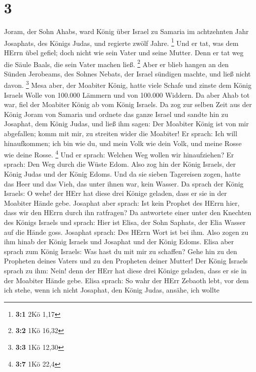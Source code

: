 \hypertarget{section-1}{%
\section{3}\label{section-1}}

 Joram, der Sohn Ahabs, ward König über Israel zu Samaria im
achtzehnten Jahr Josaphats, des Königs Judas, und regierte zwölf Jahre.
\footnote{\textbf{3:1} 2Kö 1,17}  Und er tat, was dem HErrn
übel gefiel; doch nicht wie sein Vater und seine Mutter. Denn er tat weg
die Säule Baals, die sein Vater machen ließ. \footnote{\textbf{3:2} 1Kö
  16,32}  Aber er blieb hangen an den Sünden Jerobeams, des
Sohnes Nebats, der Israel sündigen machte, und ließ nicht davon.
\footnote{\textbf{3:3} 1Kö 12,30}  Mesa aber, der Moabiter
König, hatte viele Schafe und zinste dem König Israels Wolle von 100.000
Lämmern und von 100.000 Widdern.  Da aber Ahab tot war, fiel
der Moabiter König ab vom König Israels.  Da zog zur selben
Zeit aus der König Joram von Samaria und ordnete das ganze Israel
 und sandte hin zu Josaphat, dem König Judas, und ließ ihm
sagen: Der Moabiter König ist von mir abgefallen; komm mit mir, zu
streiten wider die Moabiter! Er sprach: Ich will hinaufkommen; ich bin
wie du, und mein Volk wie dein Volk, und meine Rosse wie deine Rosse.
\footnote{\textbf{3:7} 1Kö 22,4}  Und er sprach: Welchen Weg
wollen wir hinaufziehen? Er sprach: Den Weg durch die Wüste Edom.
 Also zog hin der König Israels, der König Judas und der
König Edoms. Und da sie sieben Tagereisen zogen, hatte das Heer und das
Vieh, das unter ihnen war, kein Wasser.  Da sprach der
König Israels: O wehe! der HErr hat diese drei Könige geladen, dass er
sie in der Moabiter Hände gebe.  Josaphat aber sprach: Ist
kein Prophet des HErrn hier, dass wir den HErrn durch ihn ratfragen? Da
antwortete einer unter den Knechten des Königs Israels und sprach: Hier
ist Elisa, der Sohn Saphats, der Elia Wasser auf die Hände goss.
 Josaphat sprach: Des HErrn Wort ist bei ihm. Also zogen zu
ihm hinab der König Israels und Josaphat und der König Edoms.
 Elisa aber sprach zum König Israels: Was hast du mit mir
zu schaffen? Gehe hin zu den Propheten deines Vaters und zu den
Propheten deiner Mutter! Der König Israels sprach zu ihm: Nein! denn der
HErr hat diese drei Könige geladen, dass er sie in der Moabiter Hände
gebe.  Elisa sprach: So wahr der HErr Zebaoth lebt, vor dem
ich stehe, wenn ich nicht Josaphat, den König Judas, ansähe, ich wollte
